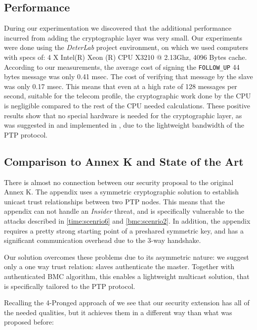 \documentclass[11pt]{article}
\begin{document}
\subsection{Performance}\label{overview:perf}

During our experimentation we discovered that the additional performance incurred from adding the cryptographic layer was very small. Our experiments were done using the \emph{DeterLab} project environment, on which we used computers with specs of: 4 X Intel(R) Xeon (R) CPU X3210 @ 2.13Ghz, 4096 Bytes cache. According to our measurements, the average cost of signing the \texttt{FOLLOW_UP} 44 bytes message was only 0.41 msec. The cost of verifying that message by the slave was only 0.17 msec. This means that even at a high rate of 128 messages per second, suitable for the telecom profile, the cryptographic work done by the CPU is negligible compared to the rest of the CPU needed calculations. These positive results show that no special hardware is needed for the cryptographic layer, as was suggested in \cite{ISPCS_2012} and implemented in \cite{FPGA}, due to the lightweight bandwidth of the PTP protocol.



\subsection{Comparison to Annex K and State of the Art}\label{sol:appendix}

There is almost no connection between our security proposal to the original Annex K. The appendix uses a symmetric cryptographic solution to establish unicast trust relationships between two PTP nodes. This means that the appendix can not handle an \emph{Insider} threat, and is specifically vulnerable to the attacks described in \ref{time:scenrio6} and \ref{bmc:scenrio2}. In addition, the appendix requires a pretty strong starting point of a preshared symmetric key, and has a significant communication overhead due to the 3-way handshake.



Our solution overcomes these problems due to its asymmetric nature: we suggest only a one way trust relation: slaves authenticate the master. Together with authenticated BMC algorithm, this enables a lightweight multicast solution, that is specifically tailored to the PTP protocol.



Recalling the 4-Pronged approach of \cite{Prongs} we see that our security extension has all of the needed qualities, but it achieves them in a different way than what was proposed before:
\end{document}
